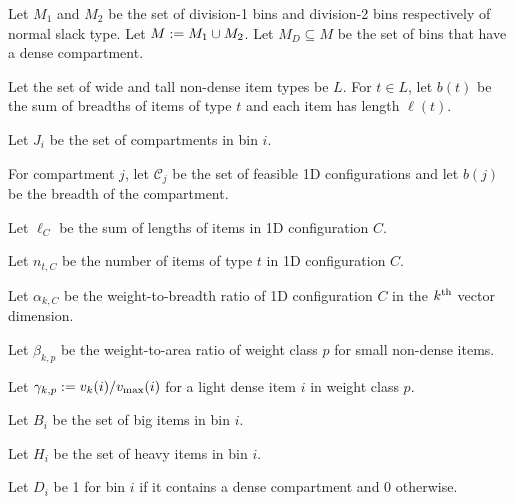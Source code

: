\begin{tightemize}
\item Let $M_1$ and $M_2$ be the set of division-1 bins and division-2 bins respectively
    of normal slack type. Let $M := M_1 \cup M_2$.
    Let $M_D \subseteq M$ be the set of bins that have a dense compartment.
\item Let the set of wide and tall non-dense item types be $L$. For $t \in L$,
    let $b(t)$ be the sum of breadths of items of type $t$
    and each item has length $\ell(t)$.
\item Let $J_i$ be the set of compartments in bin $i$.
\item For compartment $j$, let $\mathcal{C}_j$ be the set of feasible 1D configurations
    and let $b(j)$ be the breadth of the compartment.
\item Let $\ell_C$ be the sum of lengths of items in 1D configuration $C$.
\item Let $n_{t,C}$ be the number of items of type $t$ in 1D configuration $C$.
\item Let $\alpha_{k,C}$ be the weight-to-breadth ratio of 1D configuration $C$
    in the $k^{\textrm{th}}$ vector dimension.
\item Let $\beta_{k,p}$ be the weight-to-area ratio of weight class $p$ for
    small non-dense items.
\item Let $\gamma_{k,p} := v_k(i)/v_{\max}(i)$ for a light dense item $i$ in weight class $p$.
\item Let $B_i$ be the set of big items in bin $i$.
\item Let $H_i$ be the set of heavy items in bin $i$.
\item Let $D_i$ be 1 for bin $i$ if it contains a dense compartment and 0 otherwise.
\end{tightemize}

